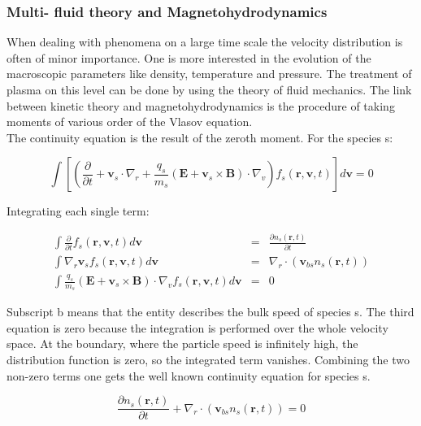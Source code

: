 \documentclass[a4paper,11pt]{thesis}
\begin{document}
\subsubsection{Multi- fluid theory and Magnetohydrodynamics}
When dealing with phenomena on a large time scale the velocity
distribution is often of minor importance. One is more interested in
the evolution of the macroscopic parameters like density,
temperature and pressure. The treatment of plasma on this level can
be done by using the theory of fluid mechanics. The link between
kinetic theory and magnetohydrodynamics is the procedure of taking
moments of various order of the Vlasov equation.\\

The continuity equation is the result of the zeroth moment. For the
species s:

\begin{equation}
\int \left[ \left( \frac{\partial}{\partial t} + \mathbf{v}_s \cdot
\nabla_r+\frac{q_s}{m_s}(\mathbf{E}+\mathbf{v}_s\times
\mathbf{B})\cdot\nabla_v \right) f_s(\mathbf{r,v},t)\right]
d\mathbf{v} =0
\end{equation}

Integrating each single term:

\begin{eqnarray}
 \int \frac{\partial}{\partial t}f_s(\mathbf{r,v},t)
d\mathbf{v} &=& \frac{\partial n_s(\mathbf{r},t)}{\partial t} \\
 \int \nabla_r \mathbf{v}_sf_s(\mathbf{r,v},t)
d\mathbf{v}&=& \nabla_r \cdot (\mathbf{v}_{bs} n_s(\mathbf{r},t) ) \\
 \int \frac{q_s}{m_s}(\mathbf{E}+\mathbf{v}_s\times
\mathbf{B})\cdot\nabla_v f_s(\mathbf{r,v},t) d\mathbf{v}&=& 0
\end{eqnarray}

Subscript b means that the entity describes the bulk speed of species s. The third equation is zero because the integration is performed over the whole velocity space. At the boundary, where the particle speed is infinitely high, the distribution function is zero, so the integrated term vanishes. Combining the two non-zero terms one gets the well known continuity
equation for species s.

\begin{equation}\label{conti_multifluid}
    \frac{\partial n_s(\mathbf{r},t)}{\partial t}+\nabla_r \cdot (\mathbf{v}_{bs} n_s(\mathbf{r},t)
    )=0
\end{equation}
\end{document}

